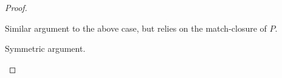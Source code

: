 \documentclass[acmsmall,screen,nonacm%
\Anonymous{,anonymous}{}%
\Final{}{,review}%
]{acmart}
\begin{document}
\begin{lemma}
\begin{proof}
\begin{proofcases}
\begin{proofcases}
\begin{proofcases}

	      \begin{llproof}
		Similar argument to the above case, but relies on the match-closure of $P$.
	      \end{llproof}
	  \end{proofcases}


	  \proofcase{$\impliedby$}

	  \begin{llproof}
	    Symmetric argument.
	  \end{llproof}
	\end{proofcases}
    \end{proofcases}
  \end{proof}
\end{lemma}
\end{document}
